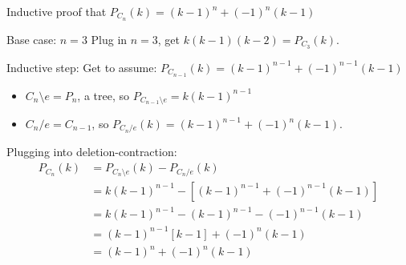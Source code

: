 \documentclass{beamer}
\begin{document}
\begin{frame}{Inductive proof that $P_{C_n}(k)=(k-1)^n+(-1)^n(k-1)$}
  \begin{block}{Base case: $n=3$}
Plug in $n=3$, get $k(k-1)(k-2)=P_{C_3}(k)$.
  \end{block}

  \begin{block}{Inductive step:}
   Get to assume: $P_{C_{n-1}}(k)=(k-1)^{n-1}+(-1)^{n-1}(k-1)$

    \begin{itemize}
      \item $C_n\setminus e=P_n$, a tree, so $P_{C_{n-1}\setminus e}=k(k-1)^{n-1}$
      \item $C_n/e=C_{n-1}$, so $P_{C_n/e}(k)=(k-1)^{n-1}+(-1)^n(k-1)$.
        \end{itemize}
\end{block}
    \begin{block}{Plugging into deletion-contraction:}   \begin{align*}
      P_{C_n}(k)&=P_{C_n\setminus e}(k)-P_{C_n/e}(k) \\
      &=k(k-1)^{n-1}-\left[(k-1)^{n-1}+(-1)^{n-1}(k-1)\right] \\
      &=k(k-1)^{n-1}-(k-1)^{n-1}-(-1)^{n-1}(k-1) \\
      &=(k-1)^{n-1}\left[k-1\right] +(-1)^n(k-1) \\
      &=(k-1)^n+(-1)^n(k-1)
    \end{align*}
    \end{block}

\end{frame}
\end{document}
